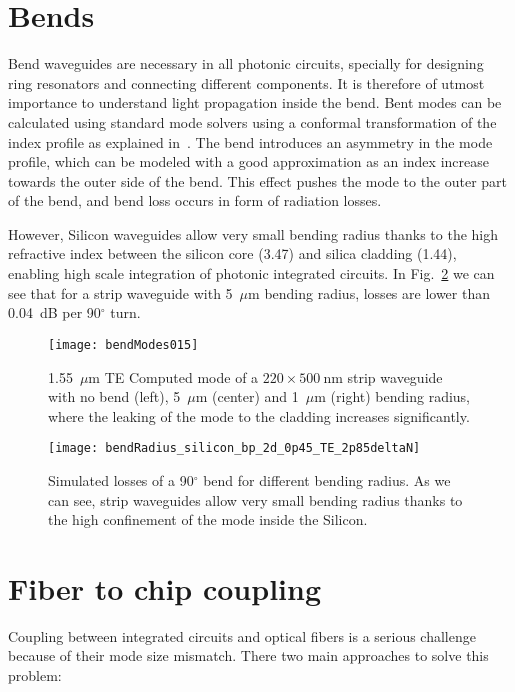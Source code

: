 \section{Bends}
Bend waveguides are necessary in all photonic circuits, specially for designing ring resonators and connecting different components. It is therefore of utmost importance to understand light propagation inside the bend.
Bent modes can be calculated using standard mode solvers using a conformal transformation of the index profile as explained in~\cite{Heiblum:75}.
The bend introduces an asymmetry in the mode profile, which can be modeled with a good approximation as an index increase towards the outer side of the bend. This effect pushes the mode to the outer part of the bend, and bend loss occurs in form of radiation losses.

However, Silicon waveguides allow very small bending radius thanks to the high refractive index between the silicon core (3.47) and silica cladding (1.44), enabling high scale integration of photonic integrated circuits. In Fig.~\ref{fig:90bendLoss} we can see that for a strip waveguide with 5~$\mu$m bending radius, losses are lower than 0.04~dB per 90$^\circ$ turn.

\begin{figure}[h]
    \centering
    \texttt{[image: bendModes015]}
    \caption{1.55~$\mu$m TE Computed mode of a $220\times500~$nm strip waveguide with no bend (left), 5~$\mu$m (center) and 1~$\mu$m (right) bending radius, where the leaking of the mode to the cladding increases significantly.}
    \label{fig:bendLoss015}
\end{figure}


\begin{figure}[h]
    \centering
    \texttt{[image: bendRadius\_silicon\_bp\_2d\_0p45\_TE\_2p85deltaN]}
    \caption{Simulated losses of a 90$^\circ$ bend for different bending radius. As we can see, strip waveguides allow very small bending radius thanks to the high confinement of the mode inside the Silicon.}
    \label{fig:90bendLoss}
\end{figure}

\section{Fiber to chip coupling}
Coupling between integrated circuits and optical fibers is a serious challenge because of their mode size mismatch. There two main approaches to solve this problem:

